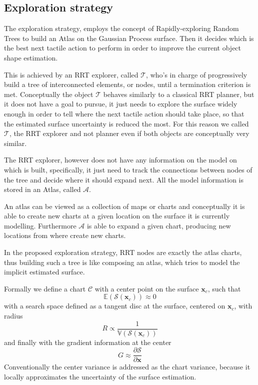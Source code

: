 \subsection{Exploration strategy}
\label{sec:strategy}

The exploration strategy, employs  the concept of Rapidly-exploring Random Trees to build
an Atlas on  the Gaussian Process surface. Then  it decides which
is  the  best next  tactile  action  to perform  in  order to improve the  current
object shape estimation.

This is achieved by an RRT explorer, called $\mathcal{T}$, who's in charge
of progressively build a tree of interconnected elements, or nodes,  until a termination criterion is met.
Conceptually the object $\mathcal{T}$ behaves similarly to a classical RRT planner,
but it does not have a goal to pursue, it just needs to explore the surface widely
enough in order to tell where the next tactile action should take place, so that
the estimated surface uncertainty is reduced the most.
For this reason we called $\mathcal{T}$, the RRT explorer and not planner even if
both objects are conceptually very similar.

The RRT explorer, however does not have any information on the model on which is built, specifically,
it just need to track the connections between nodes of the tree and decide where it
should expand next. All the model information is stored in an Atlas, called $\mathcal{A}$.

An atlas can be viewed as a collection of maps or charts and conceptually it is able
to create new charts at a given location on the surface it is currently modelling.
Furthermore $\mathcal{A}$ is able to expand a given chart, producing new locations
from where create new charts.

In the proposed exploration strategy, RRT nodes are exactly the atlas charts, thus
building such a tree is like composing an atlas, which tries to model the implicit
estimated surface.

Formally we define a chart $\mathcal{C}$ with a center point on the surface $\mathbf{x}_{c}$,
such that
$$
\mathbb{E}(\mathcal{S}(\mathbf{x}_c)) \approx 0
$$
with a search space defined as a
tangent disc at the surface, centered on $\mathbf{x}_c$, with radius 
$$
R \propto \frac{1}{\mathbb{V}(\mathcal{S}(\mathbf{x}_c))}
$$ 
and finally with the gradient information at the center 
$$
G \approx \frac{\partial \mathcal{S}}{\partial \mathbf{x}}
$$
Conventionally the center variance is addressed as the chart variance, because
it locally approximates the uncertainty of the surface estimation.


